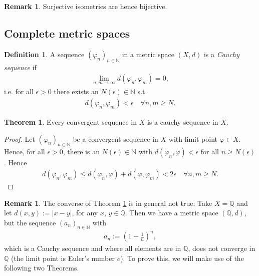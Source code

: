 \documentclass[12pt, a4paper]{article}
\numberwithin{equation}{section}
\theoremstyle{definition}
\theoremstyle{definition}
\newtheorem{defn}[thm]{Definition} %
\newtheorem{remark}[thm]{Remark} %
\newtheorem{theorem}[thm]{Theorem}
\newcommand{\abs}[1]{\left\vert #1 \right\vert}
\begin{document}
	\begin{remark}
		Surjective isometries are hence bijective.
	\end{remark}
	
	\subsection{Complete metric spaces}
	
	\begin{defn}
		A sequence $(\varphi_n)_{n\in\mathbb N}$ in a metric space $(X, d)$ is a \textit{Cauchy sequence} if 
		\begin{align}
			\lim\limits_{n, m\to\infty} d(\varphi_n, \varphi_m) = 0,
		\end{align}
		i.e. for all $\epsilon > 0$ there exists an $N(\epsilon)\in \mathbb N$ s.t. 
		\begin{align}
			d(\varphi_n, \varphi_m) < \epsilon \quad\forall n, m\geq N.
		\end{align}
	\end{defn}

	\begin{theorem}\label{thrm:convergent_sequence_cauchy_sequence}
		Every convergent sequence in $X$ is a cauchy sequence in $X$.
	\end{theorem}

	\begin{proof}
		Let $(\varphi_n)_{n\in\mathbb N}$ be a convergent sequence in $X$ with limit point $\varphi\in X$. Hence, for all $\epsilon > 0$, there is an $N(\epsilon)\in\mathbb N$ with $d(\varphi_n, \varphi) < \epsilon$ for all $n\geq N(\epsilon)$. Hence
		\begin{align}
			d(\varphi_n, \varphi_m) \leq d(\varphi_n, \varphi) + d(\varphi, \varphi_m) < 2\epsilon \quad\forall n,m\geq N.
		\end{align}
	\end{proof}

	\begin{remark}\label{remark:cauchy_not_convergent_necess}
		The converse of Theorem \ref{thrm:convergent_sequence_cauchy_sequence} is in general not true: Take $X=\mathbb Q$ and let $d(x, y) := \abs{x - y}$, for any $x$, $y\in\mathbb Q$. Then we have a metric space $(\mathbb Q, d)$, but the sequence $(a_n)_{n\in\mathbb N}$ with
		\begin{align}\label{eq:seq_euler}
			a_n := \left(1 + \frac{1}{n}\right)^n,
		\end{align}
		which is a Cauchy sequence and where all elements are in $\mathbb Q$, does not converge in $\mathbb Q$ (the limit point is Euler's number $e$). To prove this, we will make use of the following two Theorems.
	\end{remark}
	
\end{document}
